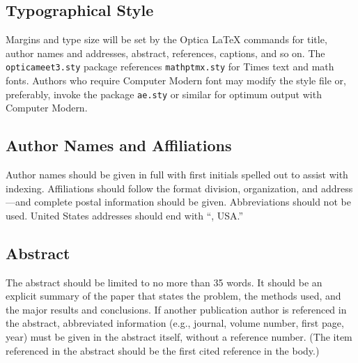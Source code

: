 \documentclass{article}
\begin{document}

\subsection{Typographical Style}
Margins and type size will be set by the Optica \LaTeX{}
commands for title, author names and addresses, abstract,
references, captions, and so on. The \texttt{opticameet3.sty} package
references \texttt{mathptmx.sty} for Times text and math fonts.
Authors who require Computer Modern font may modify the style file
or, preferably, invoke the package \texttt{ae.sty} or similar for
optimum output with Computer Modern.

\subsection{Author Names and Affiliations}
Author names should be given in full with first initials spelled out to assist with indexing.
Affiliations should follow the format division, organization, and address---and complete postal information should be given.
Abbreviations should not be used. United States addresses should end
with ``, USA.''

\subsection{Abstract} The abstract
should be limited to no more than 35 words. It should be an
explicit summary of the paper that states the problem, the methods
used, and the major results and conclusions. If another publication author is referenced in the abstract, abbreviated information
(e.g., journal, volume number, first page, year) must be
given in the abstract itself, without a reference number. (The item referenced in the abstract should be the first
cited reference  in the body.)
\end{document}
